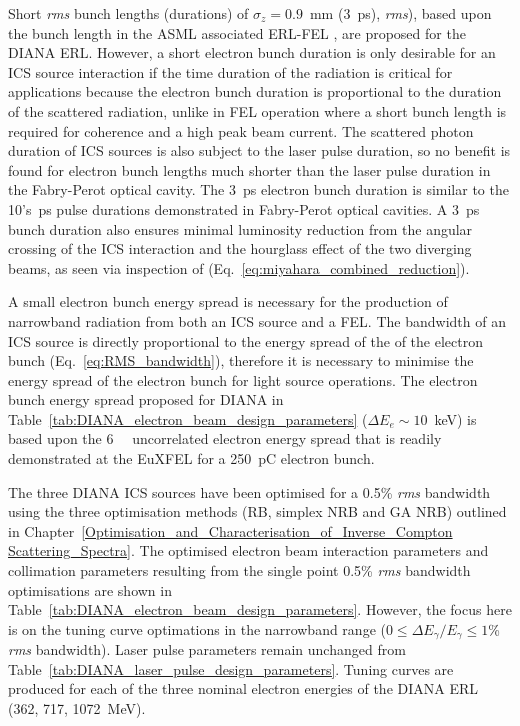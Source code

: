 \documentclass[../main.tex]{subfiles}
\begin{document}
Short \textit{rms} bunch lengths (durations) of $\sigma_{z}=0.9$~\si{\milli\meter} (3~\si{\pico\second}), \textit{rms}), based upon the bunch length in the ASML associated ERL-FEL \cite{akkermans2017compact}, are proposed for the DIANA ERL. However, a short electron bunch duration is only desirable for an ICS source interaction if the time duration of the radiation is critical for applications because the electron bunch duration is proportional to the duration of the scattered radiation, unlike in FEL operation where a short bunch length is required for coherence and a high peak beam current. The scattered photon duration of ICS sources is also subject to the laser pulse duration, so no benefit is found for electron bunch lengths much shorter than the laser pulse duration in the Fabry-Perot optical cavity. The 3~\si{\pico\second} electron bunch duration is similar to the 10's~\si{\pico\second} pulse durations demonstrated in Fabry-Perot optical cavities. A 3~\si{\pico\second} bunch duration also ensures minimal luminosity reduction from the angular crossing of the ICS interaction and the hourglass effect of the two diverging beams, as seen via inspection of (Eq.~\ref{eq:miyahara_combined_reduction}). 

A small electron bunch energy spread is necessary for the production of narrowband radiation from both an ICS source and a FEL. The bandwidth of an ICS source is directly proportional to the energy spread of the of the electron bunch (Eq.~\ref{eq:RMS_bandwidth}), therefore it is necessary to minimise the energy spread of the electron bunch for light source operations. The electron bunch energy spread proposed for DIANA in Table~\ref{tab:DIANA_electron_beam_design_parameters} ($\Delta E_{e} \sim 10$~\si{\kilo\electronvolt}) is based upon the 6~\si{\kilo\electornvolt} uncorrelated electron energy spread that is readily demonstrated at the EuXFEL \cite{tomin2021accurate} for a 250~\si{\pico\coulomb} electron bunch. 

The three DIANA ICS sources have been optimised for a 0.5\% \textit{rms} bandwidth using the three optimisation methods (RB, simplex NRB and GA NRB) outlined in Chapter~\ref{Optimisation_and_Characterisation_of_Inverse_Compton Scattering_Spectra}. The optimised electron beam interaction parameters and collimation parameters resulting from the single point 0.5\% \textit{rms} bandwidth optimisations are shown in Table~\ref{tab:DIANA_electron_beam_design_parameters}. However, the focus here is on the tuning curve optimations in the narrowband range ($0 \leq \Delta E_{\gamma}/E_{\gamma} \leq 1$\% \textit{rms} bandwidth). Laser pulse parameters remain unchanged from Table~\ref{tab:DIANA_laser_pulse_design_parameters}. Tuning curves are produced for each of the three nominal electron energies of the DIANA ERL (362, 717, 1072~\si{\mega\electronvolt}).
\end{document}
